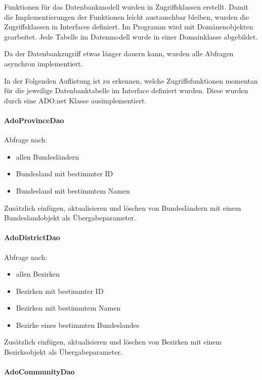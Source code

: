 Funktionen für das Datenbankmodell wurden in Zugriffsklassen erstellt.
Damit die Implementierungen der Funktionen leicht austauschbar bleiben,
wurden die Zugriffsklassen in Interfaces definiert. Im Programm wird mit
Domänenobjekten gearbeitet. Jede Tabelle im Datenmodell wurde in einer
Domainklasse abgebildet.

Da der Datenbankzugriff etwas länger dauern kann, wurden alle Abfragen
asynchron implementiert.

In der Folgenden Auflistung ist zu erkennen, welche Zugriffsfunktionen
momentan für die jeweilige Datenbanktabelle im Interface definiert
wurden. Diese wurden durch eine ADO.net Klasse ausimplementiert.


\paragraph{AdoProvinceDao}\label{adoprovincedao}

Abfrage nach:

\begin{itemize}

\item
  allen Bundesländern
\item
  Bundesland mit bestimmter ID
\item
  Bundesland mit bestimmtem Namen
\end{itemize}

Zusätzlich einfügen, aktualisieren und löschen von Bundesländern mit
einem Bundeslandobjekt als Übergabeparameter.


\paragraph{AdoDistrictDao}\label{adodistrictdao}

Abfrage nach:

\begin{itemize}

\item
  allen Bezirken
\item
  Bezirken mit bestimmter ID
\item
  Bezirken mit bestimmtem Namen
\item
  Bezirke eines bestimmten Bundeslandes
\end{itemize}

Zusätzlich einfügen, aktualisieren und löschen von Bezirken mit einem
Bezirksobjekt als Übergabeparameter.


\paragraph{AdoCommunityDao}\label{adocommunitydao}

